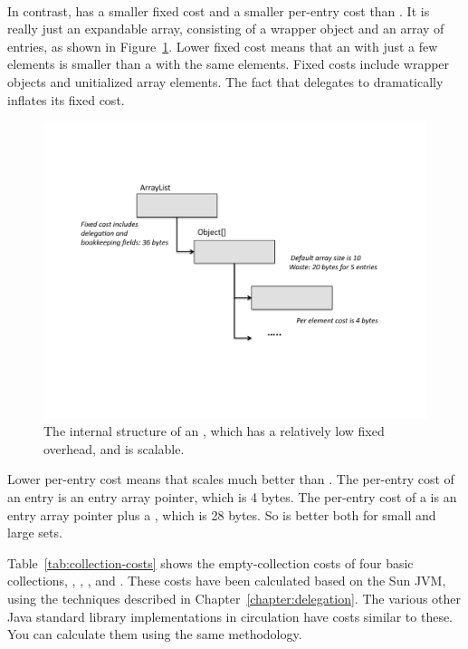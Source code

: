 \paragraph{}
In contrast,  has a smaller fixed cost and a smaller
per-entry cost than . It is really just an expandable array,
consisting of a wrapper object and an array of entries, as shown in Figure~\ref{fig:arraylist}. 
Lower fixed cost means that an  with just a few
 elements is smaller than a  with the same elements. Fixed costs
 include wrapper objects and unitialized array elements. The fact that 
 delegates to  dramatically inflates its fixed cost. 
 \begin{figure}
  \centering
 \includegraphics[width=.80\textwidth]{part1/Figures/collections/arraylist.pdf}
  \caption{The internal structure of an , which has a
  relatively low fixed overhead, and is scalable.}
  \label{fig:arraylist}
\end{figure}
 Lower per-entry cost means that
  scales much better than . The per-entry cost
 of an  entry is an entry array pointer, which is 4 bytes.
 The per-entry cost of a  is an entry array pointer plus a
 , which is 28 bytes. So   is better
 both for small and large sets.

Table~\ref{tab:collection-costs} shows the empty-collection costs of four basic
collections, , , , and . These costs have been
calculated based on the Sun JVM, using the techniques
described in Chapter~\ref{chapter:delegation}. The various other Java standard
library implementations in circulation have costs
similar to these. You can calculate them using the same methodology.

